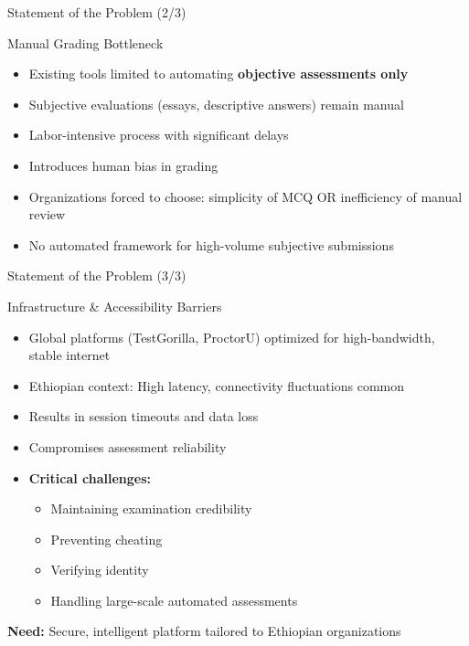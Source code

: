 \begin{frame}{Statement of the Problem (2/3)}
    \begin{alertblock}{Manual Grading Bottleneck}
        \begin{itemize}
            \item Existing tools limited to automating \textbf{objective assessments only}
            \item Subjective evaluations (essays, descriptive answers) remain manual
            \item Labor-intensive process with significant delays
            \item Introduces human bias in grading
            \item Organizations forced to choose: simplicity of MCQ OR inefficiency of manual review
            \item No automated framework for high-volume subjective submissions
        \end{itemize}
    \end{alertblock}
\end{frame}

\begin{frame}{Statement of the Problem (3/3)}
    \begin{alertblock}{Infrastructure \& Accessibility Barriers}
        \begin{itemize}
            \item Global platforms (TestGorilla, ProctorU) optimized for high-bandwidth, stable internet
            \item Ethiopian context: High latency, connectivity fluctuations common
            \item Results in session timeouts and data loss
            \item Compromises assessment reliability
            \item \textbf{Critical challenges:}
            \begin{itemize}
                \item Maintaining examination credibility
                \item Preventing cheating
                \item Verifying identity
                \item Handling large-scale automated assessments
            \end{itemize}
        \end{itemize}
    \end{alertblock}
    
    \vspace{0.3cm}
    \begin{center}
        \textbf{Need:} Secure, intelligent platform tailored to Ethiopian organizations
    \end{center}
\end{frame}

